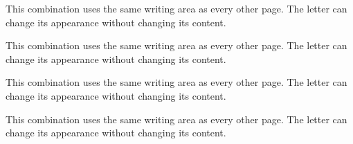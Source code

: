 \documentclass[a5paper]{seasonalletter}
\begin{document}
\begin{SeasonalLetter}[season=winter,weekday=thursday,label={winter / thursday},paper=grid]
This combination uses the same writing area as every other page.
The letter can change its appearance without changing its content.
\end{SeasonalLetter}
\begin{SeasonalLetter}[season=winter,weekday=friday,label={winter / friday},paper=grid]
This combination uses the same writing area as every other page.
The letter can change its appearance without changing its content.
\end{SeasonalLetter}
\begin{SeasonalLetter}[season=winter,weekday=saturday,label={winter / saturday},paper=grid]
This combination uses the same writing area as every other page.
The letter can change its appearance without changing its content.
\end{SeasonalLetter}
\begin{SeasonalLetter}[season=winter,weekday=sunday,label={winter / sunday},paper=grid]
This combination uses the same writing area as every other page.
The letter can change its appearance without changing its content.
\end{SeasonalLetter}
\end{document}
